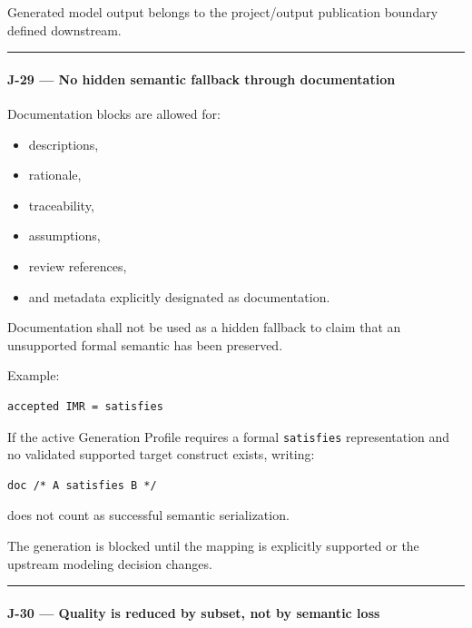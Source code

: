 Generated model output belongs to the project/output publication boundary defined downstream.

\begin{center}\rule{0.5\linewidth}{0.5pt}\end{center}

\hypertarget{j-29--no-hidden-semantic-fallback-through-documentation}{%
\paragraph{J-29 --- No hidden semantic fallback through documentation}\label{j-29--no-hidden-semantic-fallback-through-documentation}}

Documentation blocks are allowed for:

\begin{itemize}
\tightlist
\item
  descriptions,
\item
  rationale,
\item
  traceability,
\item
  assumptions,
\item
  review references,
\item
  and metadata explicitly designated as documentation.
\end{itemize}

Documentation shall not be used as a hidden fallback to claim that an unsupported formal semantic has been preserved.

Example:

\begin{verbatim}
accepted IMR = satisfies
\end{verbatim}

If the active Generation Profile requires a formal \texttt{satisfies} representation and no validated supported target construct exists, writing:

\begin{verbatim}
doc /* A satisfies B */
\end{verbatim}

does not count as successful semantic serialization.

The generation is blocked until the mapping is explicitly supported or the upstream modeling decision changes.

\begin{center}\rule{0.5\linewidth}{0.5pt}\end{center}

\hypertarget{j-30--quality-is-reduced-by-subset-not-by-semantic-loss}{%
\paragraph{J-30 --- Quality is reduced by subset, not by semantic loss}\label{j-30--quality-is-reduced-by-subset-not-by-semantic-loss}}

